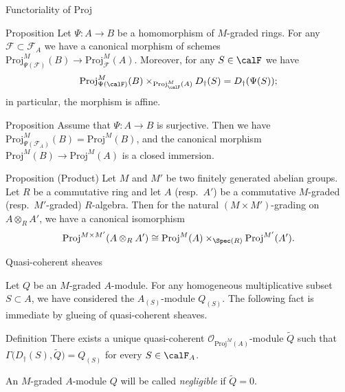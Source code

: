 \documentclass[9pt]{beamer}
\begin{document}
\begin{frame}{Functoriality of Proj}

\begin{block}{Proposition } 
Let $\Psi:A \to B $ be a homomorphism of $M$-graded rings. 
For any $\mathcal{F} \subset \mathcal{F}_A$ 
we have a canonical morphism of schemes $\mathrm{Proj}^M_{\Psi (\mathcal{F})} (B) \to \mathrm{Proj}^M_{\mathcal{F} } (A)$. Moreover, for any $S \in \calF$ we have
\begin{equation}
\mathrm{Proj}^M_{\Psi(\calF)}(B) \times_{\mathrm{Proj}_{\calF}^M(A)} D_\dag(S) = D_\dag(\Psi(S));
\end{equation}
in particular, the morphism is affine.
\end{block}

\begin{block}{Proposition  }
Assume that $\Psi : A \to B$ is surjective. Then we have $\mathrm{Proj}^M_{\Psi (\mathcal{F}_A)} (B) = \mathrm{Proj}^M (B)$, and the canonical morphism
 $\mathrm{Proj}^M(B) \to \mathrm{Proj}^M(A)$
is a closed immersion.
\end{block}

 \end{frame}


\begin{frame}

\begin{block}{Proposition (Product)}
 Let $M$ and $M'$ be two finitely generated abelian groups. Let $R$ be a commutative ring and let $A$ (resp.~$A'$) be a commutative $M$-graded (resp.~$M'$-graded) $R$-algebra. 
 Then for the natural $(M \times M')$-grading on $A \otimes_R A'$, we have a canonical isomorphism
 \[
 \mathrm{Proj} ^{M \times M'} (A \otimes_R A') \cong \mathrm{Proj} ^M (A) \times_{\Spec(R)} \mathrm{Proj} ^{M'} (A'). 
 \]
\end{block}

\end{frame}



\begin{frame}{Quasi-coherent sheaves}

Let $Q$ be an $M$-graded $A$-module. For any homogeneous multiplicative subset $S \subset A$, we have considered the $A_{(S)}$-module $Q_{(S)}$. The following fact is immediate by glueing of quasi-coherent sheaves.


\begin{block}{Definition}
There exists 
a unique quasi-coherent $\mathcal{O}_{\mathrm{Proj}^M(A)}$-module $\widetilde{Q}$ such that
$\Gamma \bigl( D_\dag(S)  , \widetilde{Q} \bigr) = Q_{(S)}$
for every $S \in \calF_A$.
\end{block}

An $M$-graded $A$-module $Q$ will be called \emph{negligible} if $\widetilde{Q}=0$.


\end{frame}
\end{document}
